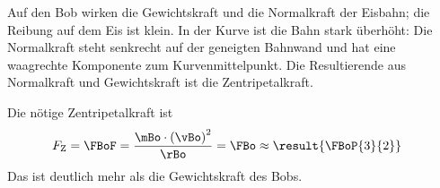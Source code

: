 \begin{abcliste}
\abc Auf den Bob wirken die Gewichtskraft und die Normalkraft der Eisbahn; die Reibung auf dem Eis ist klein. In der Kurve ist die Bahn stark überhöht: Die Normalkraft steht senkrecht auf der geneigten Bahnwand und hat eine waagrechte Komponente zum Kurvenmittelpunkt. Die Resultierende aus Normalkraft und Gewichtskraft ist die Zentripetalkraft.

\begin{center}
\end{center}

\abc Die nötige Zentripetalkraft ist
\begin{align}
 F_\mathrm{Z} &= \FBoF = \frac{\mBo\cdot\left(\vBo\right)^2}{\rBo} = \FBo \approx \result{\FBoP{3}{2}}
\end{align}
Das ist deutlich mehr als die Gewichtskraft des Bobs.
\end{abcliste}
